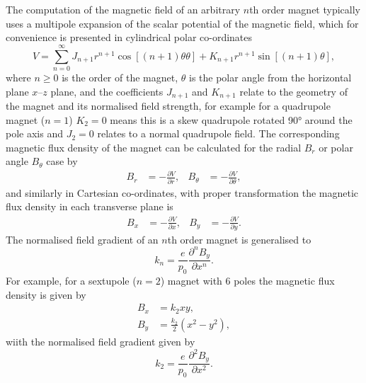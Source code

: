 \documentclass[../main.tex]{subfiles}
\begin{document}
The computation of the magnetic field of an arbitrary $n$th order magnet typically uses a multipole expansion of the scalar potential of the magnetic field, which for convenience is presented in cylindrical polar co-ordinates \cite{shepherd2016magnet}
\begin{equation}
V = \sum_{n=0}^{\infty} J_{n+1}r^{n+1}\cos\left[\left(n+1\right)\theta\theta\right]+K_{n+1}r^{n+1}\sin\left[\left(n+1\right)\theta\right],
\label{eq:multipole_scalar_potential}    
\end{equation}
where $n \geq 0$ is the order of the magnet, $\theta$ is the polar angle from the horizontal plane  $x$--$z$ plane, and the coefficients $J_{n+1}$ and $K_{n+1}$ relate to the geometry of the magnet and its normalised field strength, for example for a quadrupole magnet ($n=1$) $K_{2}=0$ means this is a skew quadrupole rotated 90\si{\degree} around the pole axis and $J_{2}=0$ relates to a normal quadrupole field. The corresponding magnetic flux density of the magnet can be calculated for the radial $B_{r}$ or polar angle $B_{\theta}$ case by    
\begin{align}
B_{r} &= -\frac{\partial V}{\partial r}, & B_{\theta} &= -\frac{\partial V}{\partial \theta},
\label{eq:multipole_magnetic_field_cylindrical}    
\end{align}
and similarly in Cartesian co-ordinates, with proper transformation the magnetic flux density in each transverse plane is
\begin{align}
B_{x} &= -\frac{\partial V}{\partial x}, & B_{y} &= -\frac{\partial V}{\partial y}.
\label{eq:multipole_magnetic_field_cartesian}
\end{align}
The normalised field gradient of an $n$th order magnet is generalised to
\begin{equation}
k_{n} = \frac{e}{p_{0}}\frac{\partial^{n} B_{y}}{\partial x^{n}}.
\label{eq:multipole_normalised_field_gradient}    
\end{equation}
For example, for a sextupole ($n=2$) magnet with 6 poles the magnetic flux density is given by
\begin{align}
B_{x} &= k_{2}xy, \nonumber \\
B_{y} &= \frac{k_{2}}{2}\left(x^{2}-y^{2}\right),
\label{eq:sextupole_magnetic_field}    
\end{align}
wiith the normalised field gradient given by 
\begin{equation}
k_{2} = \frac{e}{p_{0}}\frac{\partial^{2}B_{y}}{\partial x^{2}}.
\label{eq:sextupole_field_gradient}    
\end{equation}
\end{document}
